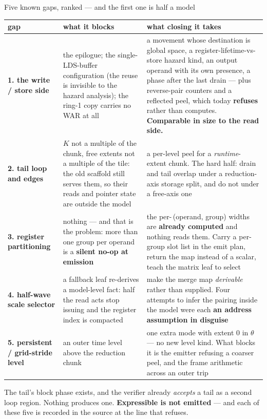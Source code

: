 \documentclass[aspectratio=169,9pt]{beamer}
\newcommand{\key}[1]{\textcolor{acc}{\textbf{#1}}}
\newcommand{\bad}[1]{\textcolor{warn}{\textbf{#1}}}
\newcommand{\good}[1]{\textcolor{ok}{\textbf{#1}}}
\begin{document}
\begin{frame}{Five known gaps, ranked --- and the first one is half a model}
\vspace{-2pt}
{\scriptsize
\begin{tabular}{@{}p{}p{}p{}@{}}
\toprule
\textbf{gap} & \textbf{what it blocks} & \textbf{what closing it takes} \\
\midrule
\key{1. the write / store side} &
the epilogue; the single-LDS-buffer configuration (the reuse is invisible to the hazard analysis); the ring-1 copy carries no WAR at all &
a movement whose destination is global space, a register-lifetime-vs-store hazard kind, an output operand with its own presence, a phase after the last drain --- plus reverse-pair counters and a reflected peel, which today \bad{refuses} rather than computes. \bad{Comparable in size to the read side.} \\
\addlinespace
\key{2. tail loop and edges} &
$K$ not a multiple of the chunk, free extents not a multiple of the tile: the old scaffold still serves them, so their reads and pointer state are outside the model &
a per-level peel for a \emph{runtime}-extent chunk. The hard half: drain and tail overlap under a reduction-axis storage split, and do not under a free-axis one \\
\addlinespace
\key{3. register partitioning} &
nothing --- and that is the problem: more than one group per operand is a \bad{silent no-op at emission} &
the per-\,(operand, group) widths are \good{already computed} and nothing reads them. Carry a per-group slot list in the emit plan, return the map instead of a scalar, teach the matrix leaf to select \\
\addlinespace
\key{4. half-wave scale selector} &
a fallback leaf re-derives a model-level fact: half the read acts stop issuing and the register index is compacted &
make the merge map \emph{derivable} rather than supplied. Four attempts to infer the pairing inside the model were each \bad{an address assumption in disguise} \\
\addlinespace
\key{5. persistent / grid-stride level} &
an outer time level above the reduction chunk &
one extra mode with extent 0 in $\theta$ --- no new level kind. What blocks it is the emitter refusing a coarser peel, and the frame arithmetic across an outer trip \\
\bottomrule
\end{tabular}}

\vspace{4pt}
{\footnotesize The tail's block phase exists, and the verifier already \emph{accepts} a tail as a second loop region. Nothing produces one. \bad{Expressible is not emitted} --- and each of these five is recorded in the source at the line that refuses.}
\end{frame}
\end{document}

